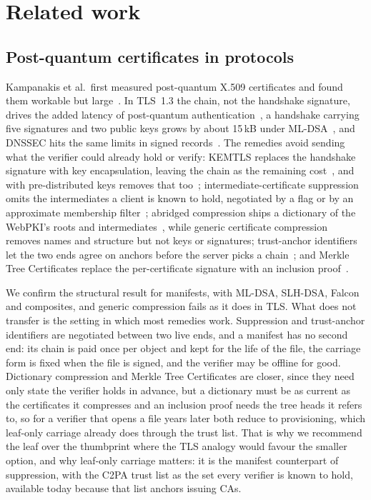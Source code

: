 \section{Related work}
\label{sec:related}

\subsection{Post-quantum certificates in protocols}
\label{sec:related-tls}

Kampanakis et al.\ first measured post-quantum X.509 certificates and found
them workable but large~\cite{kampanakis2018viability}. In TLS~1.3 the chain,
not the handshake signature, drives the added latency of post-quantum
authentication~\cite{sikeridis2020ndss,sikeridis2020conext,paquin2020,%
sosnowski2023}, a handshake carrying five signatures and two public keys
grows by about 15\,kB under ML-DSA~\cite{westerbaan2021,westerbaan2024look},
and DNSSEC hits the same limits in signed records~\cite{muller2020dnssec,%
goertzen2023post}. The remedies avoid sending what the verifier could already
hold or verify: KEMTLS replaces the handshake signature with key
encapsulation, leaving the chain as the remaining
cost~\cite{schwabe2020kemtls}, and with pre-distributed keys removes that
too~\cite{schwabe2021kemtlspdk}; intermediate-certificate suppression omits
the intermediates a client is known to hold, negotiated by a flag or by an
approximate membership filter~\cite{kampanakis2022scas,%
sikeridis2022suppression}; abridged compression ships a dictionary of the
WebPKI's roots and intermediates~\cite{certabridge}, while generic certificate
compression~\cite{rfc8879} removes names and structure but not keys or
signatures; trust-anchor identifiers let the two ends agree on anchors before
the server picks a chain~\cite{trustanchorids}; and Merkle Tree Certificates
replace the per-certificate signature with an inclusion
proof~\cite{merkletreecerts}.

We confirm the structural result for manifests, with ML-DSA, SLH-DSA, Falcon
and composites, and generic compression fails as it does in TLS. What does
not transfer is the setting in which most remedies work. Suppression and
trust-anchor identifiers are negotiated between two live ends, and a manifest
has no second end: its chain is paid once per object and kept for the life of
the file, the carriage form is fixed when the file is signed, and the verifier
may be offline for good. Dictionary compression and Merkle Tree Certificates
are closer, since they need only state the verifier holds in advance, but a
dictionary must be as current as the certificates it compresses and an
inclusion proof needs the tree heads it refers to, so for a verifier that
opens a file years later both reduce to provisioning, which leaf-only
carriage already does through the trust list. That
is why we recommend the leaf over the thumbprint where the TLS analogy would
favour the smaller option, and why leaf-only carriage matters: it is the
manifest counterpart of suppression, with the C2PA trust list as the set every
verifier is known to hold, available today because that list anchors issuing
CAs.

